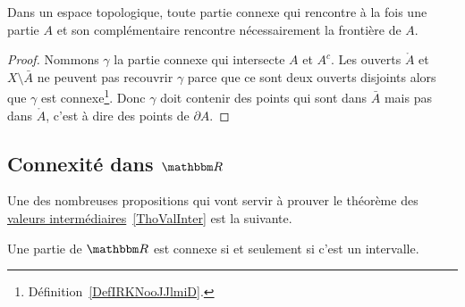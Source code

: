 \begin{lemma}        \label{LEMooLKWEooItGnkP}
    Dans un espace topologique, toute partie connexe qui rencontre à la fois une partie \( A\) et son complémentaire rencontre nécessairement la frontière de \( A\).
\end{lemma}

\begin{proof}
    Nommons \( \gamma\) la partie connexe qui intersecte \( A\) et \( A^c\). Les ouverts \( \mathring A\) et \( X\setminus \bar A\) ne peuvent pas recouvrir \( \gamma\) parce que ce sont deux ouverts disjoints alors que \( \gamma\) est connexe\footnote{Définition~\ref{DefIRKNooJJlmiD}.}. Donc \( \gamma\) doit contenir des points qui sont dans \( \bar A\) mais pas dans \( \mathring A\), c'est à dire des points de \( \partial A\).
\end{proof}

\subsection{Connexité dans \texorpdfstring{$\eR$}{R}}

Une des nombreuses propositions qui vont servir à prouver le théorème des \href{http://fr.wikipedia.org/wiki/Théorème_des_valeurs_intermédiaires}{valeurs intermédiaires}~\ref{ThoValInter} est la suivante.
\begin{proposition} \label{PropInterssiConn}
    Une partie de $\eR$ est connexe si et seulement si c'est un intervalle.
\end{proposition}

